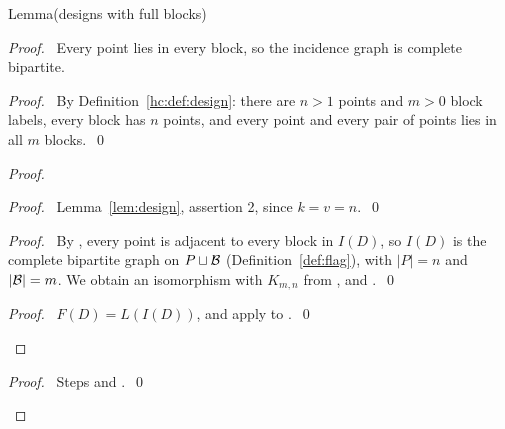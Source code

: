 \begin{namedresult}{Lemma}{(designs with full blocks)}\label{lem:fullblock}
\end{namedresult}
\begin{proof}
 \pfsketch\ Every point lies in every block, so the incidence graph is complete bipartite.
 \begin{proof}\pf\ By Definition~\ref{hc:def:design}: there are $n>1$ points and $m>0$ block
  labels, every block has $n$ points, and every point and every pair of points lies in all $m$
  blocks.~\qed\end{proof}
 \begin{proof}
  \begin{proof}\pf\ Lemma~\ref{lem:design}, assertion 2, since $k=v=n$.~\qed\end{proof}
  \begin{proof}\pf\ By , every point is adjacent to every block in $I(D)$,
   so $I(D)$ is the complete bipartite graph on $P\sqcup{\mathcal B}$ (Definition~\ref{def:flag}), with
   $|P|=n$ and $|{\mathcal B}|=m$. We obtain an isomorphism with $K_{m,n}$ from ,
    and .~\qed\end{proof}
  \qedstep
  \begin{proof}\pf\ $F(D)=L(I(D))$, and apply  to
   .~\qed\end{proof}
 \end{proof}
 \qedstep
 \begin{proof}\pf\ Steps  and .~\qed\end{proof}
\end{proof}

